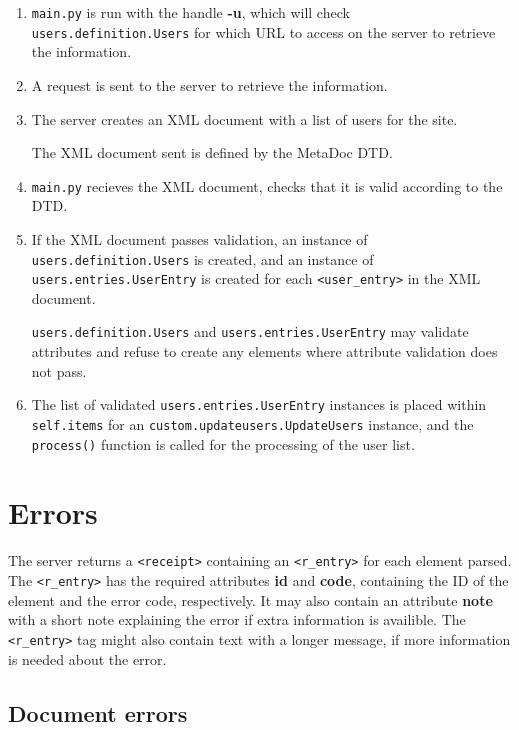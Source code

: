 \documentclass[titlepage, a4paper,10pt]{article}
\begin{document}
\begin{enumerate}
    \item
        \texttt{main.py} is run with the handle \textbf{-u}, which will check
        \texttt{users.definition.Users} for which URL to access on the server
        to retrieve the information.
    \item
        A request is sent to the server to retrieve the information.
    \item
        The server creates an XML document with a list of users for the site.
        
        The XML document sent is defined by the MetaDoc DTD.
    \item
        \texttt{main.py} recieves the XML document, checks that it is valid
        according to the DTD. 
    \item
        If the XML document passes validation, an instance of
        \texttt{users.definition.Users} is created, and an instance of
        \texttt{users.entries.UserEntry} is created for each
        \texttt{<user\_entry>} in the XML document.

        \texttt{users.definition.Users} and \texttt{users.entries.UserEntry}
        may validate attributes and refuse to create any elements where
        attribute validation does not pass.
    \item
        The list of validated \texttt{users.entries.UserEntry} instances is
        placed within \texttt{self.items} for an
        \texttt{custom.updateusers.UpdateUsers} instance, and the
        \texttt{process()} function is called for the processing of the user
        list.
\end{enumerate}

\newpage
\section{Errors}
\label{sec:errors}

The server returns a \texttt{<receipt>} containing an \texttt{<r\_entry>} for 
each element parsed. The \texttt{<r\_entry>} has the required attributes 
\textbf{id} and \textbf{code}, containing the ID of the element and the error 
code, respectively. It may also contain an attribute \textbf{note} with a short 
note explaining the error if extra information is availible. The 
\texttt{<r\_entry>} tag might also contain text with a longer message, if more 
information is needed about the error. 

\subsection{Document errors}
\end{document}
